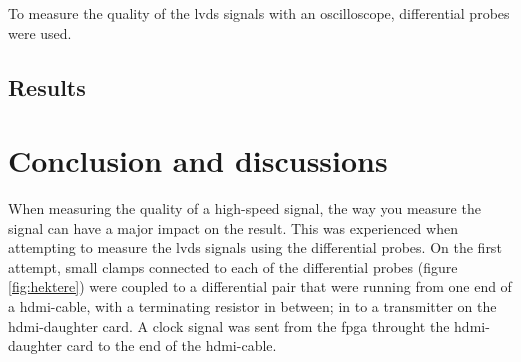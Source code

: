 \documentclass[main.tex]{subfiles}
\begin{document}
To measure the quality of the \gls{lvds} signals with an oscilloscope, differential probes were used.  


\subsection{Results}


\section{Conclusion and discussions}


When measuring the quality of a high-speed signal, the way you measure the signal can have a major impact on the result. This was experienced when attempting to measure the \gls{lvds} signals using the differential probes. On the first attempt, small clamps connected to each of the differential probes (figure \ref{fig:hektere}) were coupled to a differential pair that were running from one end of a hdmi-cable, with a terminating resistor in between; in to a transmitter on the \gls{hdmi}-daughter card. A clock signal was sent from the \gls{fpga} throught the \gls{hdmi}-daughter card to the end of the hdmi-cable. 

\begin{figure}[H] 
   \begin{center}
   \end{center}
\end{figure}
\end{document}
